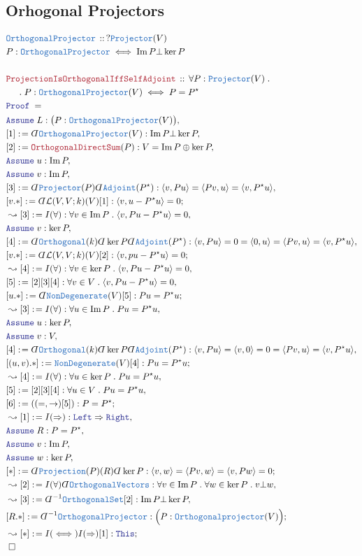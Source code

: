 \documentclass[12pt]{scrartcl}%
\newcommand{\TYPE}[1]{\textcolor{NavyBlue}{\mathtt{#1}}}%
\newcommand{\LOGIC}[1]{\textcolor{Blue}{\mathtt{#1}}}%
\newcommand{\THM}[1]{\textcolor{Maroon}{\mathtt{#1}}}%
\renewcommand{\.}{\; . \;} %
\newcommand{\de}{: \kern 0.1pc =} %
\newcommand{\Theorem}[2]{& \THM{#1} \, :: \, #2 \\ & \Proof = \\ } %
\newcommand{\DeclareType}[2]{& \TYPE{#1} \, :: \, #2 \\}%
\newcommand{\DefineType}[3]{& #1 : \TYPE{#2} \iff #3 \\}%
\newcommand{\NewLine}{\\ & \kern 1pc}%
\newcommand{\Page}[1]{ \begin{align*} #1 \end{align*}  }%
\newcommand{ \bd }{ \ByDef }%
\DeclareMathOperator*{\im}{Im}%
\newcommand{\Say}[3]{& #1 \de #2 : #3, \\} %
\newcommand{\Conclude}[3]{& #1 \de #2 : #3; \\}%
\newcommand{\Derive}[3]{& \leadsto #1 \de #2 : #3, \\} %
\newcommand{\DeriveConclude}[3]{& \leadsto #1 \de #2 : #3 ; \\} %
\newcommand{\Assume}[2]{& \LOGIC{Assume} \; #1 : #2, \\} %
\newcommand{\QED}{\; \square} %
\newcommand{\EndProof}{& \QED \\} %
\newcommand{\ByDef}{\rotatebox[origin=c]{-180}{$D$}}%
\newcommand{\Proof}{\LOGIC{Proof} \; } %
\renewcommand{\L}{\mathcal{L}}
\begin{document}
\subsection{Orhogonal Projectors}
\Page{
	\DeclareType{OrthogonalProjector}{? \TYPE{Projector}(V)}
	\DefineType{P}{OrthogonalProjector}{\im P \bot \ker P}
	\\
	\Theorem{ProjectionIsOrthogonalIffSelfAdjoint}{\forall P : \TYPE{Projector}(V) \.  \NewLine \. P : \TYPE{OrthogonalProjector}(V) \iff P = P^\star}
	\Assume{L}{\big(P : \TYPE{OrthogonalProjector}(V)  \big)}
	\Say{[1]}{\bd \TYPE{OrthogonalProjector}(V)}{  \im P \bot \ker P}
	\Say{[2]}{\THM{OrthogonalDirectSum}(P)}{V = \im P \oplus \ker P}
	\Assume{u}{\im P}
	\Assume{v}{\im P}
	\Say{[3]}{\bd  \TYPE{Projector}(P)\bd \TYPE{Adjoint}(P^\star) }{  \langle v, Pu \rangle  = \langle Pv, u \rangle = \langle v, P^\star u \rangle}
	\Conclude{[v.*]}{\bd \L(V,V;k)(V)[1]}{\langle v, u - P^\star u \rangle = 0}
	\Derive{[3]}{I(\forall)}{ \forall v \in \im P \. \langle v, Pu - P^\star u \rangle = 0}
	\Assume{v}{\ker P}
	\Say{[4]}{ \bd  \TYPE{Orthogonal}(k) \bd \ker P \bd \TYPE{Adjoint}(P^\star)}{  \langle v, Pu \rangle  = 0 = \langle 0, u \rangle = \langle Pv, u \rangle = \langle v, P^\star u \rangle } 
	\Conclude{[v.*]}{\bd \L(V,V;k)(V)[2]}{ \langle v, pu - P^\star u \rangle = 0}
	\Derive{[4]}{I(\forall)}{\forall v \in \ker P \. \langle v, Pu - P^\star u \rangle = 0}
	\Say{[5]}{[2][3][4] }{ \forall v \in V \. \langle v,Pu - P^\star u \rangle = 0 }
	\Conclude{[u.*]}{\bd \TYPE{NonDegenerate}(V)[5] }{Pu =  P^\star u}
	\Derive{[3]}{I(\forall)}{\forall u \in \im P \. Pu = P^\star u}
	\Assume{u}{\ker P}
	\Assume{v}{V}
	\Say{[4]}{\bd  \TYPE{Orthogonal}(k) \bd \ker P \bd \TYPE{Adjoint}(P^\star) }{ \langle v, Pu \rangle = \langle v, 0 \rangle = 0 = \langle Pv, u \rangle = \langle v, P^\star u \rangle}
	\Conclude{[(u,v).*]}{\TYPE{NonDegenerate}(V)[4] }{ Pu = P^\star u  }
	\Derive{[4]}{I(\forall)}{\forall u \in \ker P  \. Pu = P^\star u }
	\Say{[5]}{[2][3][4]}{\forall  u \in V \. Pu = P^\star u}
	\Conclude{[6]}{((=,\to)[5])}{P = P^\star}
	\Derive{[1]}{I(\Rightarrow)}{\LOGIC{Left} \Rightarrow \LOGIC{Right}}
	\Assume{R}{P = P^\star}
	\Assume{v}{\im P}
	\Assume{w}{\ker P}
	\Conclude{[*]}{\bd \TYPE{Projection}(P)(R)\bd \ker P }{ \langle v, w \rangle = \langle Pv, w \rangle = \langle v,Pw \rangle = 0}
	\Derive{[2]}{I(\forall)\bd \TYPE{OrthogonalVectors}}{\forall v \in \im P \. \forall w \in \ker P \. v \bot w}
	\Derive{[3]}{\bd^{-1}\TYPE{OrthogonalSet}[2]}{ \im P \bot \ker P   }
	\Conclude{[R.*]}{\bd^{-1}\TYPE{OrthogonalProjector}}{\Big(P : \TYPE{Orthogonalprojector}(V)\Big)}
	\DeriveConclude{[*]}{I(\iff)I(\Rightarrow)[1]}{\LOGIC{This}}
	\EndProof
}
\end{document}
